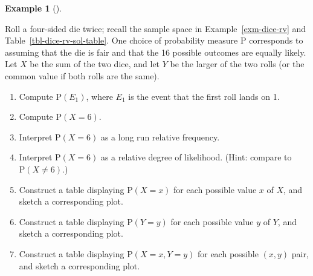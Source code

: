 \documentclass[
  letterpaper,
  DIV=11,
  numbers=noendperiod]{scrreprt}
\providecommand{\tightlist}{%
  \setlength{\itemsep}{0pt}\setlength{\parskip}{0pt}}
\theoremstyle{plain}
\theoremstyle{definition}
\newtheorem{example}{Example}[chapter]
\theoremstyle{definition}
\theoremstyle{definition}
\theoremstyle{remark}
\begin{document}
\begin{tcolorbox}[enhanced jigsaw, opacityback=0, left=2mm, colframe=quarto-callout-note-color-frame, toprule=.15mm, breakable, colback=white, leftrule=.75mm, arc=.35mm, rightrule=.15mm, bottomrule=.15mm]

\begin{example}[]\protect\hypertarget{exm-dice-probspace}{}\label{exm-dice-probspace}

Roll a four-sided die twice; recall the sample space in
Example~\ref{exm-dice-rv} and Table~\ref{tbl-dice-rv-sol-table}. One
choice of probability measure \(\textrm{P}\) corresponds to assuming
that the die is fair and that the 16 possible outcomes are equally
likely. Let \(X\) be the sum of the two dice, and let \(Y\) be the
larger of the two rolls (or the common value if both rolls are the
same).

\begin{enumerate}
\def\labelenumi{\arabic{enumi}.}
\tightlist
\item
  Compute \(\textrm{P}(E_1)\), where \(E_1\) is the event that the first
  roll lands on 1.\\
\item
  Compute \(\textrm{P}(X = 6)\).
\item
  Interpret \(\textrm{P}(X = 6)\) as a long run relative frequency.
\item
  Interpret \(\textrm{P}(X = 6)\) as a relative degree of likelihood.
  (Hint: compare to \(\textrm{P}(X \neq 6)\).)
\item
  Construct a table displaying \(\textrm{P}(X = x)\) for each possible
  value \(x\) of \(X\), and sketch a corresponding plot.
\item
  Construct a table displaying \(\textrm{P}(Y = y)\) for each possible
  value \(y\) of \(Y\), and sketch a corresponding plot.
\item
  Construct a table displaying \(\textrm{P}(X = x, Y= y)\) for each
  possible \((x, y)\) pair, and sketch a corresponding plot.
\end{enumerate}

\end{example}

\end{tcolorbox}
\end{document}
